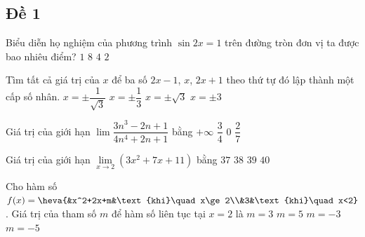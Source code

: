 \subsection{Đề 1}
\caulc
\begin{ex}%
Biểu diễn họ nghiệm của phương trình $\sin2x=1$ trên đường tròn đơn vị ta được bao nhiêu điểm?
\choice
{$1$}
{$8$}
{$4$}
{\True $2$}
\end{ex}

\begin{ex}%
Tìm tất cả giá trị của $x$ để ba số $2x-1$, $x$, $2x+1$ theo thứ tự đó lập thành một cấp số nhân.
\choice
{\True $x=\pm \dfrac{1}{\sqrt{3}}$}
{$x=\pm \dfrac{1}{3}$}
{$x=\pm \sqrt{3}$}
{$x=\pm 3$}
\end{ex}

\begin{ex}%
Giá trị của giới hạn $\lim \dfrac{3n^3-2n+1}{4n^4+2n+1}$ bằng
\choice
{$+\infty$}
{$\dfrac{3}{4}$}
{\True $0$}
{$\dfrac{2}{7}$}
\end{ex}

\begin{ex}%
	Giá trị của giới hạn $\lim\limits_{x\to 2} (3x^2+7x+11)$ bằng
	\choice
	{\True $37$}
	{$38$}
	{$39$}
	{$40$}
\end{ex}

\begin{ex}%
Cho hàm số $f(x)=\heva{&x^2+2x+m&\text{khi}\quad x\ge 2\\&3&\text{khi}\quad x<2}$. Giá trị của tham số $m$ để hàm số liên tục tại $x=2$ là
\choice
{$m=3$}
{$m=5$}
{$m=-3$}
{\True $m=-5$}
\end{ex}

